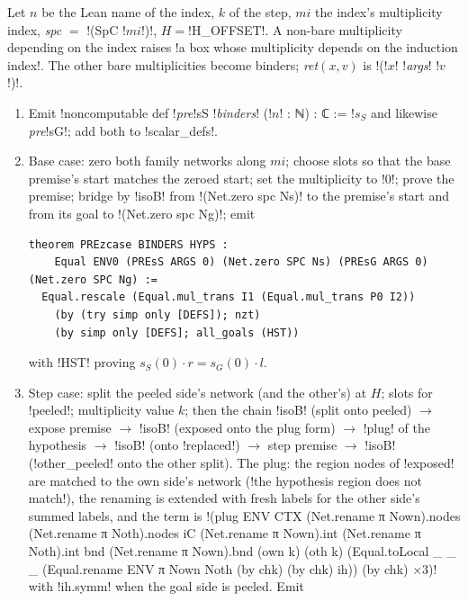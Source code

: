 {\begin{algorithm}\label{alg:lean-export-net-induction}
Let $n$ be the Lean name of the index, $k$ of the step, $mi$ the index's multiplicity index,
\textit{spc} $=$ \code!(SpC !$mi$\code!)!, $H={}$\py!H_OFFSET!. A non-bare multiplicity depending
on the index raises \code!a box whose multiplicity depends on the induction index!. The other
bare multiplicities become binders; \textit{ret}$(x, v)$ is \code!(!$x$\code! !\textit{args}\code! !$v$\code!)!.
\begin{enumerate}
\item Emit \code!noncomputable def !\textit{pre}\code!sS !\textit{binders}\code! (!$n$\code! : ℕ) : ℂ := !$s_S$
  and likewise \textit{pre}\code!sG!; add both to \py!scalar_defs!.
\item Base case: zero both family networks along $mi$; choose slots so that the base premise's
  start matches the zeroed start; set the multiplicity to \code!0!; prove the premise; bridge by
  \lean!isoB! from \code!(Net.zero spc Ns)! to the premise's start and from its goal to
  \code!(Net.zero spc Ng)!; emit
\begin{lstlisting}[style=grammar]
theorem PREzcase BINDERS HYPS :
    Equal ENV0 (PREsS ARGS 0) (Net.zero SPC Ns) (PREsG ARGS 0) (Net.zero SPC Ng) :=
  Equal.rescale (Equal.mul_trans I1 (Equal.mul_trans P0 I2))
    (by (try simp only [DEFS]); nzt)
    (by simp only [DEFS]; all_goals (HST))
\end{lstlisting}
  with \code!HST! proving $s_S(0)\cdot r = s_G(0)\cdot l$.
\item Step case: split the peeled side's network (and the other's) at $H$; slots for
  \code!peeled!; multiplicity value $k$; then the chain
  \lean!isoB! (split onto peeled) $\to$ expose premise $\to$ \lean!isoB! (exposed onto the plug
  form) $\to$ \code!plug! of the hypothesis $\to$ \lean!isoB! (onto \code!replaced!) $\to$ step
  premise $\to$ \lean!isoB! (\code!other_peeled! onto the other split). The plug: the region nodes
  of \code!exposed! are matched to the own side's network (\code!the hypothesis region does not match!),
  the renaming is extended with fresh labels for the other side's summed labels, and the term is
  \code!(plug ENV CTX (Net.rename π Nown).nodes (Net.rename π Noth).nodes iC (Net.rename π Nown).int (Net.rename π Noth).int bnd (Net.rename π Nown).bnd (own k) (oth k) (Equal.toLocal _ _ _ (Equal.rename ENV π Nown Noth (by chk) (by chk) ih)) (by chk) ×3)!
  with \code!ih.symm! when the goal side is peeled. Emit
\begin{lstlisting}[style=grammar]

\end{lstlisting}
\end{enumerate}
\end{algorithm}}
